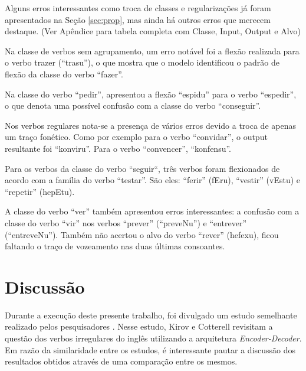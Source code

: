 Alguns erros interessantes como troca de classes e regularizações já foram apresentados na Seção \ref{sec:prop}, mas ainda há outros erros que merecem destaque. (Ver Apêndice para tabela completa com Classe, Input, Output e Alvo)

Na classe de verbos sem agrupamento, um erro notável foi a flexão realizada para o verbo trazer (“trasu”), o que mostra que o modelo identificou o padrão de flexão da classe do verbo “fazer”. 

Na classe do verbo “pedir”, apresentou a flexão “espidu” para o verbo “espedir”, o que denota uma possível confusão com a classe do verbo “conseguir”.

Nos verbos regulares nota-se a presença de vários erros devido a troca de apenas um traço fonético. Como por exemplo para o verbo “convidar”, o output resultante foi “konviru”. Para o verbo “convencer”, “konfensu”.

Para os verbos da classe do verbo “seguir“, três verbos foram flexionados de acordo com a família do verbo “testar”. São eles: “ferir” (fEru), “vestir” (vEstu) e “repetir” (hepEtu).

A classe do verbo “ver” também apresentou erros interessantes: a confusão com a classe do verbo “vir” nos verbos “prever” (“preveNu”) e “entrever” (“entreveNu”). Também não acertou o alvo do verbo “rever” (hefexu), ficou faltando o traço de vozeamento nas duas últimas consoantes.

\section{Discussão}
\label{sec:discuss}

Durante a execução deste presente trabalho, foi divulgado um estudo semelhante realizado pelos pesquisadores \cite{kirov:2018}. Nesse estudo, Kirov e Cotterell revisitam a questão dos verbos irregulares do inglês utilizando a arquitetura \textit{Encoder-Decoder}. Em razão da similaridade entre os estudos, é interessante pautar a discussão dos resultados obtidos através de uma comparação entre os mesmos. 

